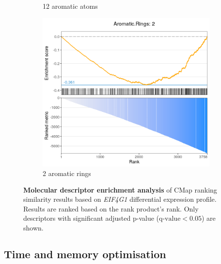 \begin{figure}[!h]
\begin{subfigure}[h]{0.32\textwidth}
		\caption{\footnotesize{12 aromatic atoms}}
	\end{subfigure}
	\begin{subfigure}[h]{0.32\textwidth}
		\includegraphics[width=\textwidth]{images/ctrap/molecular-descriptors-c}
		\caption{\footnotesize{2 aromatic rings}}
	\end{subfigure}
	\caption[Molecular descriptor enrichment analysis]{\textbf{Molecular descriptor enrichment analysis} of CMap ranking similarity results based on \emph{EIF4G1} differential expression profile. Results are ranked based on the rank product's rank. Only descriptors with significant adjusted p-value ($\textrm{q-value} < 0.05$) are shown.}
	\label{fig:ctrap-descriptors}
\end{figure}

\subsection{Time and memory optimisation}
\label{subsec:ctrap-optim}

